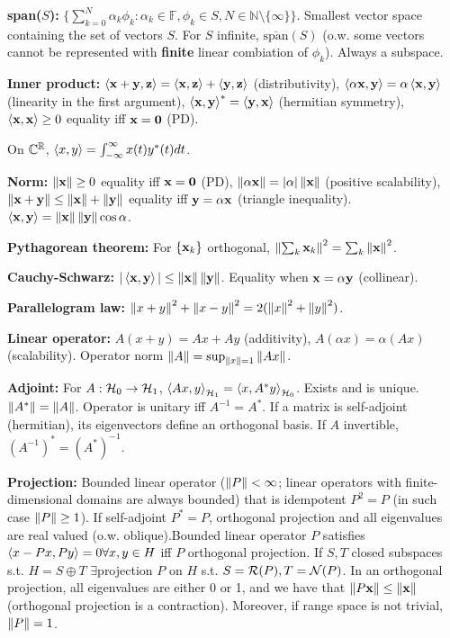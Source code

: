 \documentclass{article}
\begin{document}
\begin{multicols*}{3}
    \textbf{span($S$):} $\{\sum_{k=0}^N\alpha_k\phi_k:\alpha_k\in \mathbb{F},\phi_k\in S,N\in\mathbb{N}\setminus\{\infty\} \}$. Smallest vector space containing the set of vectors $S$. For $S$ infinite, $\overline{\text{span}}(S)$ (o.w. some vectors cannot be represented with \textbf{finite} linear combiation of $\phi_k$). Always a subspace.
    
    \textbf{Inner product: }$\left\langle \mathbf{x} + \mathbf{y}, \mathbf{z} \right\rangle = \left\langle \mathbf{x}, \mathbf{z} \right\rangle + \left\langle \mathbf{y}, \mathbf{z} \right\rangle$ (distributivity), $\left\langle \alpha \mathbf{x}, \mathbf{y} \right\rangle= \alpha \left\langle \mathbf{x}, \mathbf{y} \right\rangle$ (linearity in the first argument), $\left\langle \mathbf{x}, \mathbf{y} \right\rangle^*= \left\langle \mathbf{y}, \mathbf{x} \right\rangle$ (hermitian symmetry), $\left\langle \mathbf{x}, \mathbf{x} \right\rangle \geq 0$ equality iff $\mathbf{x} = \mathbf{0}$ (PD). 
    
    On $\mathbb{C}^{\mathbb{R}}$, $\left\langle x,y \right\rangle=\int_{-\infty}^\infty x(t)y^*(t)dt$.
    
    \textbf{Norm: }$\left\lVert\mathbf{x}\right\rVert \geq 0$ equality iff $\mathbf{x} = \mathbf{0}$ (PD), $\left\lVert\alpha \mathbf{x}\right\rVert = |\alpha| \left\lVert\mathbf{x}\right\rVert$ (positive scalability), $\left\lVert\mathbf{x} + \mathbf{y}\right\rVert \leq \left\lVert\mathbf{x}\right\rVert+\left\lVert\mathbf{y}\right\rVert$ equality iff $\mathbf{y} = \alpha \mathbf{x}$ (triangle inequality). $\left\langle \mathbf{x},\mathbf{y} \right\rangle=\left\lVert\mathbf{x}\right\rVert\left\lVert\mathbf{y}\right\rVert\cos\alpha$.
    
    \textbf{Pythagorean theorem: }For $\{\mathbf{x}_k\}$ orthogonal, $\left\lVert\sum_k \mathbf{x}_k\right\rVert^2 = \sum_{k}\left\lVert\mathbf{x}\right\rVert^2$.
    
    \textbf{Cauchy-Schwarz: }$|\left\langle \mathbf{x},\mathbf{y} \right\rangle|\leq \left\lVert\mathbf{x}\right\rVert\left\lVert\mathbf{y}\right\rVert$. Equality when $\mathbf{x}=\alpha\mathbf{y}$ (collinear).
    
    \textbf{Parallelogram law: }$\left\lVert x+y\right\rVert^2+\left\lVert x-y\right\rVert^2=2(\left\lVert x\right\rVert^2+\left\lVert y\right\rVert^2)$.
     
    \textbf{Linear operator: }$A(x+y)=Ax+Ay$ (additivity), $A(\alpha x)=\alpha(Ax)$ (scalability). Operator norm $\left\lVert A\right\rVert=\sup_{\left\lVert x\right\rVert=1}\left\lVert Ax\right\rVert$.
    
    \textbf{Adjoint: }For $A:\mathcal{H}_0\to \mathcal{H}_1$, $\left\langle Ax,y \right\rangle_{\mathcal{H}_1}=\left\langle x,A^*y \right\rangle_{\mathcal{H}_0}$. Exists and is unique. $\left\lVert A^*\right\rVert=\left\lVert A\right\rVert$. Operator is unitary iff $A^{-1}=A^*$. If a matrix is self-adjoint (hermitian), its eigenvectors define an orthogonal basis. If $A$ invertible, $(A^{-1})^*=(A^*)^{-1}$.

    \textbf{Projection: }Bounded linear operator ($\left\lVert P\right\rVert<\infty$; linear operators with finite-dimensional domains are always bounded) that is idempotent $P^2=P$ (in such case $\left\lVert P\right\rVert\geq 1$). If self-adjoint $P^*=P$, orthogonal projection and all eigenvalues are real valued (o.w. oblique).Bounded linear operator $P$ satisfies $\left\langle x-Px,Py \right\rangle=0 \forall x,y\in H$ iff $P$ orthogonal projection. If $S, T$ closed subspaces s.t. $H = S \oplus T$ $\exists$projection $P$ on $H$ s.t. $S = \mathcal{R}(P),T = \mathcal{N} (P)$. In an orthogonal projection, all eigenvalues are either 0 or 1, and we have that $\left\lVert P\mathbf{x}\right\rVert\leq \left\lVert\mathbf{x}\right\rVert$ (orthogonal projection is a contraction). Moreover, if range space is not trivial, $\left\lVert P\right\rVert=1$.
    

\end{multicols*}
\end{document}
